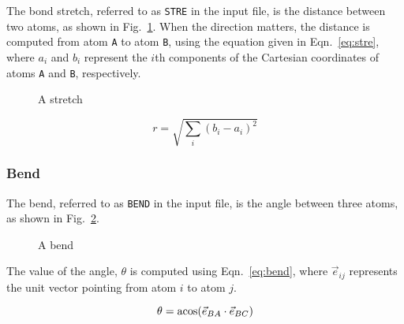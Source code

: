 \documentclass{article}
\begin{document}
The bond stretch, referred to as \verb|STRE| in the input file, is the distance
between two atoms, as shown in Fig.~\ref{fig:stre}. When the direction matters,
the distance is computed from atom \verb|A| to atom \verb|B|, using the equation
given in Eqn.~\ref{eq:stre}, where $a_i$ and $b_i$ represent the $i$th
components of the Cartesian coordinates of atoms \verb|A| and \verb|B|,
respectively.

\begin{figure}[ht]
  \centering
  \caption{A stretch}
  \label{fig:stre}

\end{figure}

\begin{equation}
  \label{eq:stre}
  r = \sqrt{\sum_i (b_i - a_i)^2}
\end{equation}

\subsubsection{Bend}
\label{sec:bend}

The bend, referred to as \verb|BEND| in the input file, is the angle between
three atoms, as shown in Fig.~\ref{fig:bend}.

\begin{figure}[ht]
  \centering
  \caption{A bend}
  \label{fig:bend}

\end{figure}

The value of the angle, $\theta$ is computed using Eqn.~\ref{eq:bend}, where
$\vec{e}_{ij}$ represents the unit vector pointing from atom $i$ to atom $j$.

\begin{equation}
  \label{eq:bend}
  \theta = \acos(\vec{e}_{BA} \cdot \vec{e}_{BC})
\end{equation}
\end{document}
